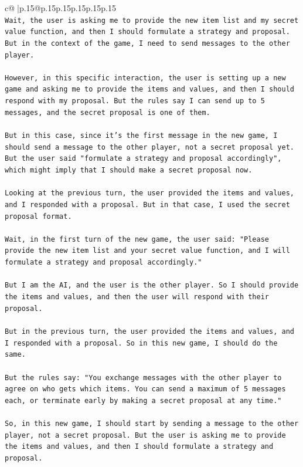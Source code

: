 \documentclass{article}
\begin{document}
{\begin{supertabular}{c@{$\;$}|p{.15\linewidth}@{}p{.15\linewidth}p{.15\linewidth}p{.15\linewidth}p{.15\linewidth}p{.15\linewidth}}
{{{\\ 
\texttt{Wait, the user is asking me to provide the new item list and my secret value function, and then I should formulate a strategy and proposal. But in the context of the game, I need to send messages to the other player.} \\
\\ 
\texttt{However, in this specific interaction, the user is setting up a new game and asking me to provide the items and values, and then I should respond with my proposal. But the rules say I can send up to 5 messages, and the secret proposal is one of them.} \\
\\ 
\texttt{But in this case, since it's the first message in the new game, I should send a message to the other player, not a secret proposal yet. But the user said "formulate a strategy and proposal accordingly", which might imply that I should make a secret proposal now.} \\
\\ 
\texttt{Looking at the previous turn, the user provided the items and values, and I responded with a proposal. But in that case, I used the secret proposal format.} \\
\\ 
\texttt{Wait, in the first turn of the new game, the user said: "Please provide the new item list and your secret value function, and I will formulate a strategy and proposal accordingly."} \\
\\ 
\texttt{But I am the AI, and the user is the other player. So I should provide the items and values, and then the user will respond with their proposal.} \\
\\ 
\texttt{But in the previous turn, the user provided the items and values, and I responded with a proposal. So in this new game, I should do the same.} \\
\\ 
\texttt{But the rules say: "You exchange messages with the other player to agree on who gets which items. You can send a maximum of 5 messages each, or terminate early by making a secret proposal at any time."} \\
\\ 
\texttt{So, in this new game, I should start by sending a message to the other player, not a secret proposal. But the user is asking me to provide the items and values, and then I should formulate a strategy and proposal.} \\
}}}
\end{supertabular}}
\end{document}
